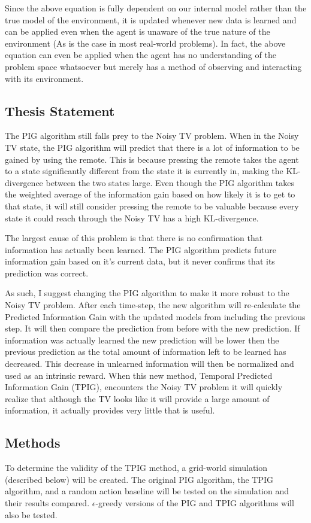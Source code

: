 \documentclass[letterpaper]{article} %
\begin{document}
Since the above equation is fully dependent on our internal model rather than the true model of the environment, it is updated whenever new data is learned and can be applied even when the agent is unaware of the true nature of the environment (As is the case in most real-world problems). In fact, the above equation can even be applied when the agent has no understanding of the problem space whatsoever but merely has a method of observing and interacting with its environment.

\subsection{Thesis Statement}
The PIG algorithm still falls prey to the Noisy TV problem. When in the Noisy TV state, the PIG algorithm will predict that there is a lot of information to be gained by using the remote. This is because pressing the remote takes the agent to a state significantly different from the state it is currently in, making the KL-divergence between the two states large. Even though the PIG algorithm takes the weighted average of the information gain based on how likely it is to get to that state, it will still consider pressing the remote to be valuable because every state it could reach through the Noisy TV has a high KL-divergence.

The largest cause of this problem is that there is no confirmation that information has actually been learned. The PIG algorithm predicts future information gain based on it’s current data, but it never confirms that its prediction was correct.

As such, I suggest changing the PIG algorithm to make it more robust to the Noisy TV problem. After each time-step, the new algorithm will re-calculate the Predicted Information Gain with the updated models from including the previous step. It will then compare the prediction from before with the new prediction. If information was actually learned the new prediction will be lower then the previous prediction as the total amount of information left to be learned has decreased. This decrease in unlearned information will then be normalized and used as an intrinsic reward. When this new method, Temporal Predicted Information Gain (TPIG), encounters the Noisy TV problem it will quickly realize that although the TV looks like it will provide a large amount of information, it actually provides very little that is useful.

\subsection{Methods}
To determine the validity of the TPIG method, a grid-world simulation (described below) will be created. The original PIG algorithm, the TPIG algorithm, and a random action baseline will be tested on the simulation and their results compared. $\epsilon$-greedy versions of the PIG and TPIG algorithms will also be tested.
\end{document}
